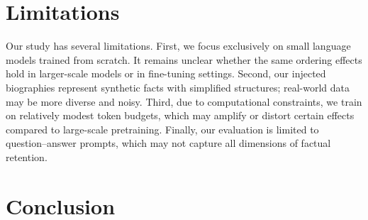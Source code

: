 \documentclass[11pt]{article}
\begin{document}
\section{Limitations}
Our study has several limitations. First, we focus exclusively on small language models trained from scratch. It remains unclear whether the same ordering effects hold in larger-scale models or in fine-tuning settings. Second, our injected biographies represent synthetic facts with simplified structures; real-world data may be more diverse and noisy. Third, due to computational constraints, we train on relatively modest token budgets, which may amplify or distort certain effects compared to large-scale pretraining. Finally, our evaluation is limited to question–answer prompts, which may not capture all dimensions of factual retention.

\section{Conclusion}

% 
% 
\end{document}
